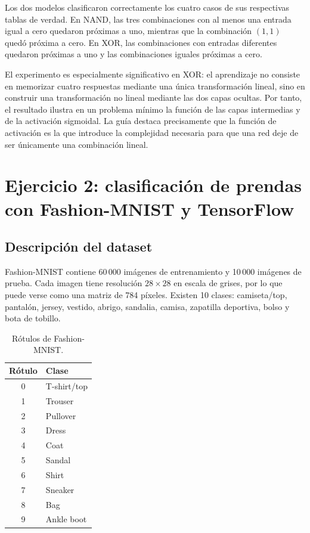 \documentclass[14pt,twoside]{article}
\begin{document}
Los dos modelos clasificaron correctamente los cuatro casos de sus respectivas tablas de verdad. En NAND, las tres combinaciones con al menos una entrada igual a cero quedaron próximas a uno, mientras que la combinación $(1,1)$ quedó próxima a cero. En XOR, las combinaciones con entradas diferentes quedaron próximas a uno y las combinaciones iguales próximas a cero.

El experimento es especialmente significativo en XOR: el aprendizaje no consiste en memorizar cuatro respuestas mediante una única transformación lineal, sino en construir una transformación no lineal mediante las dos capas ocultas. Por tanto, el resultado ilustra en un problema mínimo la función de las capas intermedias y de la activación sigmoidal. La guía destaca precisamente que la función de activación es la que introduce la complejidad necesaria para que una red deje de ser únicamente una combinación lineal. \cite{martinez2026}

\section{Ejercicio 2: clasificación de prendas con Fashion-MNIST y TensorFlow}

\subsection{Descripción del dataset}

Fashion-MNIST contiene 60\,000 imágenes de entrenamiento y 10\,000 imágenes de prueba. Cada imagen tiene resolución $28\times28$ en escala de grises, por lo que puede verse como una matriz de 784 píxeles. Existen 10 clases: camiseta/top, pantalón, jersey, vestido, abrigo, sandalia, camisa, zapatilla deportiva, bolso y bota de tobillo. \cite{tensorflowfashion,tensorflowapi}

\begin{table}[H]
\centering
\caption{Rótulos de Fashion-MNIST.}
\begin{tabular}{cl}
\toprule
Rótulo & Clase \\
\midrule
0 & T-shirt/top \\
1 & Trouser \\
2 & Pullover \\
3 & Dress \\
4 & Coat \\
5 & Sandal \\
6 & Shirt \\
7 & Sneaker \\
8 & Bag \\
9 & Ankle boot \\
\bottomrule
\end{tabular}
\end{table}
\end{document}
